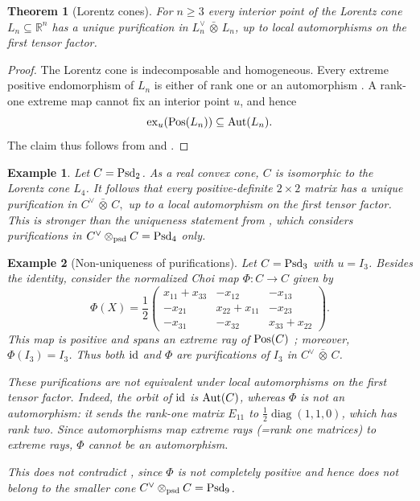 \documentclass[11pt]{article}
\newcommand{\barabove}[1]{\hspace{2pt}\bar{#1}\hspace{2pt}}
\theoremstyle{result}
\newtheorem{theorem}{Theorem}[section]
\theoremstyle{discussion}
\newtheorem{example}[example]{Example}
\newcommand{\omax}{\barabove{\otimes}}
\begin{document}
\begin{theorem}[Lorentz cones]
    For $n\geqslant 3$ every interior point of the Lorentz cone $L_n\subseteq\mathbb R^n$ has a unique purification in $L_n^\vee\omax L_n$, up to local
    automorphisms on the first tensor factor.
\end{theorem}

\begin{proof}
   The Lorentz cone is
    indecomposable and homogeneous. Every extreme positive endomorphism of
    $L_n$ is either of rank one or an automorphism
    \citep[Theorem 4.5]{LoewySchneider1975}. A rank-one extreme map cannot fix an interior
    point $u$, and hence
    \[
        {\rm ex}_u({\rm Pos}(L_n))\subseteq{\rm Aut}(L_n).
    \]
    The claim thus follows from  and .
\end{proof}

\begin{example}
    Let $C={\rm Psd}_2$. As a real convex
    cone, $C$ is isomorphic to the Lorentz cone $L_4$. It follows that every
    positive-definite $2\times2$ matrix has a unique purification in $C^\vee\omax C,$
    up to a local automorphism on the first tensor factor.
    This is stronger than the uniqueness statement from , which considers purifications in 
    $C^\vee\otimes_{\rm psd}C={\rm Psd}_4$ only.
\end{example}

\begin{example}[Non-uniqueness of purifications]
\label{ex:choi}
    Let $C={\rm Psd}_3$ with $u=I_3$. Besides the identity,
    consider the normalized Choi map $\Phi\colon C\to C$ given by
    \[
        \Phi(X)=\frac{1}{2}
        \begin{pmatrix}
            x_{11}+x_{33} & -x_{12} & -x_{13} \\
            -x_{21} & x_{22}+x_{11} & -x_{23} \\
            -x_{31} & -x_{32} & x_{33}+x_{22}
        \end{pmatrix}.
    \]
    This map is positive and spans an extreme ray of ${\rm Pos}(C)$
    \citep{Choi1975,Ha2013}; moreover, $\Phi(I_3)=I_3$. Thus both ${\rm id}$ and
    $\Phi$ are purifications of $I_3$ in $C^\vee\omax C$.

    These purifications are not equivalent under local automorphisms on the
    first tensor factor. Indeed, the orbit of ${\rm id}$ is ${\rm Aut}(C)$,
    whereas $\Phi$ is not an automorphism: it sends the rank-one matrix
    $E_{11}$ to $\tfrac12\operatorname{diag}(1,1,0)$, which has rank two. Since automorphisms map extreme rays (=rank one matrices) to extreme rays, $\Phi$ cannot be an automorphism.
   
    This does not contradict , since $\Phi$ is not
    completely positive and hence does not belong to the smaller cone
    $C^\vee\otimes_{\rm psd}C={\rm Psd}_9$.
\end{example}
\end{document}
